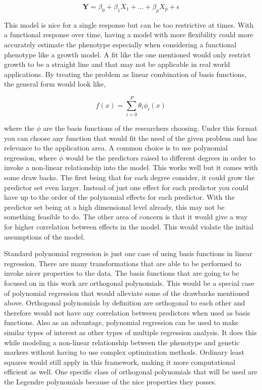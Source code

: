 \documentclass[11pt,]{book}
\theoremstyle{definition}
\theoremstyle{definition}
\theoremstyle{remark}
\begin{document}
\begin{equation}
\mathbf{Y} = \beta_0 + \beta_1 X_1 + \dots + \beta_p X_p + \epsilon
\label{eq:lin-mod}
\end{equation}

This model is nice for a single response but can be too restrictive at
times. With a functional response over time, having a model with more
flexibility could more accurately estimate the phenotype especially when
considering a functional phenotype like a growth model. A fit like the
one mentioned would only restrict growth to be a straight line and that
may not be applicable in real world applications. By treating the
problem as linear combination of basis functions, the general form would
look like,

\begin{equation}
f(x) = \sum_{i=0}^P \theta_i \phi_i(x)
\label{eq:gen-form}
\end{equation}

where the \(\phi\) are the basis functions of the researchers choosing.
Under this format you can choose any function that would fit the need of
the given problem and has relevance to the application area. A common
choice is to use polynomial regression, where \(\phi\) would be the
predictors raised to different degrees in order to invoke a non-linear
relationship into the model. This works well but it comes with some draw
backs. The first being that for each degree consider, it could grow the
predictor set even larger. Instead of just one effect for each predictor
you could have up to the order of the polynomial effects for each
predictor. With the predictor set being at a high dimensional level
already, this may not be something feasible to do. The other area of
concern is that it would give a way for higher correlation between
effects in the model. This would violate the initial assumptions of the
model.

Standard polynomial regression is just one case of using basis functions
in linear regression. There are many transformations that are able to be
performed to invoke nicer properties to the data. The basis functions
that are going to be focused on in this work are orthogonal polynomials.
This would be a special case of polynomial regression that would
alleviate some of the drawbacks mentioned above. Orthogonal polynomials
by definition are orthogonal to each other and therefore would not have
any correlation between predictors when used as basis functions. Also as
an advantage, polynomial regression can be used to make similar types of
interest as other types of multiple regression analysis. It does this
while modeling a non-linear relationship between the phenotype and
genetic markers without having to use complex optimization methods.
Ordinary least squares would still apply in this framework, making it
more computational efficient as well. One specific class of orthogonal
polynomials that will be used are the Legendre polynomials because of
the nice properties they posses.
\end{document}
